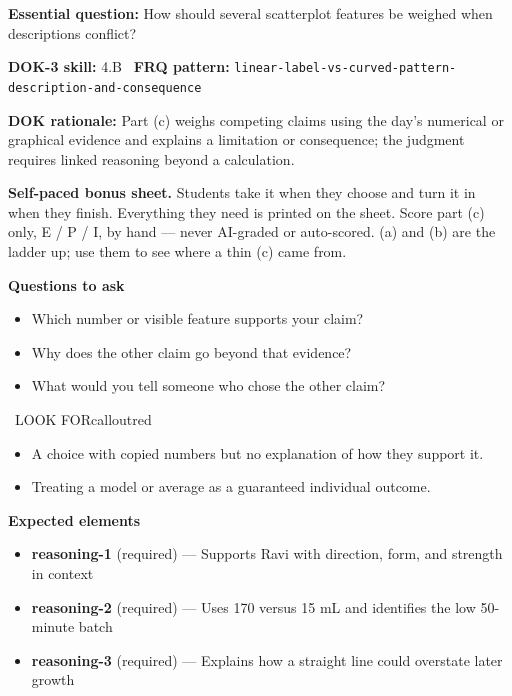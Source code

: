 \documentclass[11pt]{article}
\begin{document}
\textbf{Essential question:} How should several scatterplot features be weighed when descriptions conflict?\par
\textbf{DOK-3 skill:} 4.B \textperiodcentered\ \textbf{FRQ pattern:} {\small\texttt{linear-\allowbreak{}label-\allowbreak{}vs-\allowbreak{}curved-\allowbreak{}pattern-\allowbreak{}description-\allowbreak{}and-\allowbreak{}consequence}}\par
\textbf{DOK rationale:} Part (c) weighs competing claims using the day's numerical or graphical evidence and explains a limitation or consequence; the judgment requires linked reasoning beyond a calculation.\par

\textbf{Self-paced bonus sheet.} Students take it when they choose and turn it in when they finish. Everything they need is printed on the sheet. Score part (c) only, E / P / I, by hand --- never AI-graded or auto-scored. (a) and (b) are the ladder up; use them to see where a thin (c) came from.\par

\textbf{Questions to ask}
\begin{itemize}[leftmargin=1.5em,itemsep=2pt,topsep=2pt]
  \item Which number or visible feature supports your claim?
  \item Why does the other claim go beyond that evidence?
  \item What would you tell someone who chose the other claim?
\end{itemize}

\begin{callout}{\IconWarn\ LOOK FOR}{calloutred}
\begin{itemize}[leftmargin=1.5em,itemsep=2pt,topsep=2pt]
  \item A choice with copied numbers but no explanation of how they support it.
  \item Treating a model or average as a guaranteed individual outcome.
\end{itemize}
\end{callout}


\textbf{Expected elements}
\begin{itemize}[leftmargin=1.5em,itemsep=2pt,topsep=2pt]
  \item \textbf{reasoning-1} (required) --- Supports Ravi with direction, form, and strength in context
  \item \textbf{reasoning-2} (required) --- Uses 170 versus 15 mL and identifies the low 50-minute batch
  \item \textbf{reasoning-3} (required) --- Explains how a straight line could overstate later growth
\end{itemize}
\end{document}
